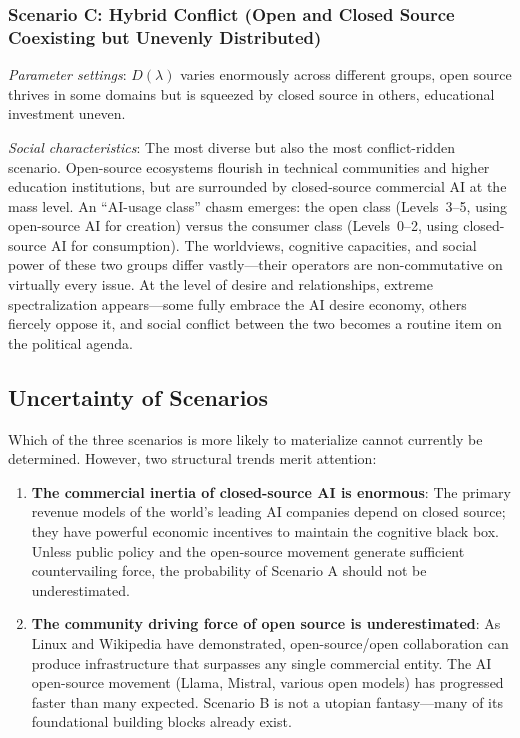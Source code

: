 ﻿\documentclass[12pt,a4paper]{article}
\begin{document}
\subsubsection{Scenario C: Hybrid Conflict (Open and Closed Source Coexisting but Unevenly Distributed)}

\textit{Parameter settings}: $D(\lambda)$ varies enormously across different groups, open source thrives in some domains but is squeezed by closed source in others, educational investment uneven.

\textit{Social characteristics}: The most diverse but also the most conflict-ridden scenario. Open-source ecosystems flourish in technical communities and higher education institutions, but are surrounded by closed-source commercial AI at the mass level. An ``AI-usage class'' chasm emerges: the open class (Levels~3--5, using open-source AI for creation) versus the consumer class (Levels~0--2, using closed-source AI for consumption). The worldviews, cognitive capacities, and social power of these two groups differ vastly---their operators are non-commutative on virtually every issue. At the level of desire and relationships, extreme spectralization appears---some fully embrace the AI desire economy, others fiercely oppose it, and social conflict between the two becomes a routine item on the political agenda.

\subsection{Uncertainty of Scenarios}

Which of the three scenarios is more likely to materialize cannot currently be determined. However, two structural trends merit attention:

\begin{enumerate}[label=(\arabic*)]
\item \textbf{The commercial inertia of closed-source AI is enormous}: The primary revenue models of the world's leading AI companies depend on closed source; they have powerful economic incentives to maintain the cognitive black box. Unless public policy and the open-source movement generate sufficient countervailing force, the probability of Scenario A should not be underestimated.
\item \textbf{The community driving force of open source is underestimated}: As Linux and Wikipedia have demonstrated, open-source/open collaboration can produce infrastructure that surpasses any single commercial entity. The AI open-source movement (Llama, Mistral, various open models) has progressed faster than many expected. Scenario B is not a utopian fantasy---many of its foundational building blocks already exist.
\end{enumerate}
\end{document}
